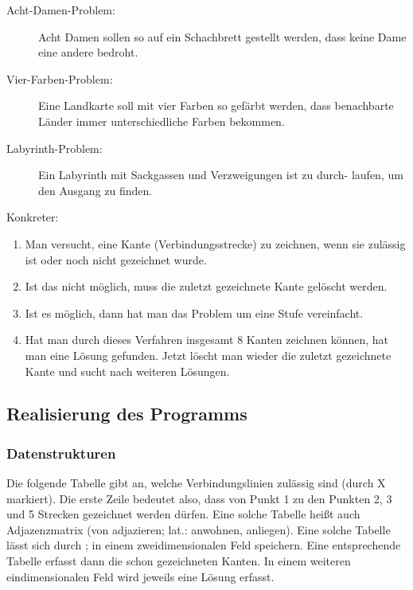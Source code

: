 \documentclass{lehramt-informatik-haupt}
\begin{document}
\begin{description}
\item[Acht-Damen-Problem:] Acht Damen sollen so auf ein Schachbrett
gestellt werden, dass keine Dame eine andere bedroht.

\item[Vier-Farben-Problem:] Eine Landkarte soll mit vier Farben so
gefärbt werden, dass benachbarte Länder immer unterschiedliche Farben
bekommen.

\item[Labyrinth-Problem:] Ein Labyrinth mit Sackgassen und Verzweigungen
ist zu durch- laufen, um den Ausgang zu finden.
\end{description}

\noindent
Konkreter:

\begin{enumerate}
\item Man versucht, eine Kante (Verbindungsstrecke) zu zeichnen, wenn
sie zulässig ist oder noch nicht gezeichnet wurde.

\item Ist das nicht möglich, muss die zuletzt gezeichnete Kante gelöscht
werden.

\item  Ist es möglich, dann hat man das Problem um eine Stufe
vereinfacht.

\item  Hat man durch dieses Verfahren insgesamt 8 Kanten zeichnen
können, hat man eine Lösung gefunden. Jetzt löscht man wieder die
zuletzt gezeichnete Kante und sucht nach weiteren Lösungen.
\end{enumerate}

\subsection{Realisierung des Programms}

\subsubsection{Datenstrukturen}

Die folgende Tabelle gibt an, welche Verbindungslinien zulässig sind
(durch X markiert). Die erste Zeile bedeutet also, dass von Punkt 1 zu
den Punkten 2, 3 und 5 Strecken gezeichnet werden dürfen. Eine solche
Tabelle heißt auch Adjazenzmatrix (von adjazieren; lat.: anwohnen,
anliegen). Eine solche Tabelle lässt sich durch ; in einem zweidimensionalen Feld speichern. Eine
entsprechende Tabelle  erfasst dann die
schon gezeichneten Kanten. In einem weiteren eindimensionalen Feld
wird jeweils eine Lösung erfasst.
\end{document}
